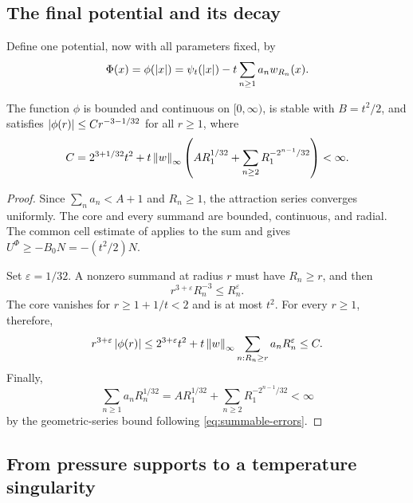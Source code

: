 \subsection{The final potential and its decay}

Define one potential, now with all parameters fixed, by
\begin{equation}\label{eq:final-potential}
 \Phi(x)=\phi(\left|x\right|)
   =\psi_t(\left|x\right|)-t\sum_{n\ge1}a_nw_{R_n}(x).
\end{equation}

\begin{proposition}\label{m:tail}
The function \(\phi\) is bounded and continuous on \([0,\infty)\),
is stable with \(B=t^2/2\), and satisfies
\(\left|\phi(r)\right|\le Cr^{-3-1/32}\) for all \(r\ge1\), where
\begin{equation}\label{eq:tail-constant}
 C=2^{3+1/32}t^2+t\left\lVert w\right\rVert_{\infty}
       \left(A R_1^{1/32}
              +\sum_{n\ge2}R_1^{-2^{n-1}/32}\right)<\infty.
\end{equation}
\end{proposition}

\begin{proof}
Since \(\sum_na_n<A+1\) and \(R_n\ge1\), the attraction series
converges uniformly.
The core and every summand are bounded, continuous, and radial.
The common cell estimate of  applies to the sum and
gives \(U^\Phi\ge-B_0N=-(t^2/2)N\).

Set \(\varepsilon=1/32\).
A nonzero summand at radius \(r\) must have \(R_n\ge r\), and then
\[
 r^{3+\varepsilon}R_n^{-3}\le R_n^\varepsilon.
\]
The core vanishes for \(r\ge1+1/t<2\) and is at most \(t^2\).
For every \(r\ge1\), therefore,
\[
 r^{3+\varepsilon}\left|\phi(r)\right|
 \le 2^{3+\varepsilon}t^2
          +t\left\lVert w\right\rVert_\infty\sum_{n:R_n\ge r}a_nR_n^\varepsilon
 \le C.
\]
Finally,
\[
 \sum_{n\ge1}a_nR_n^{1/32}
 =A R_1^{1/32}+\sum_{n\ge2}R_1^{-2^{n-1}/32}<\infty
\]
by the geometric-series bound following
\eqref{eq:summable-errors}.
\end{proof}

\subsection{From pressure supports to a temperature singularity}

